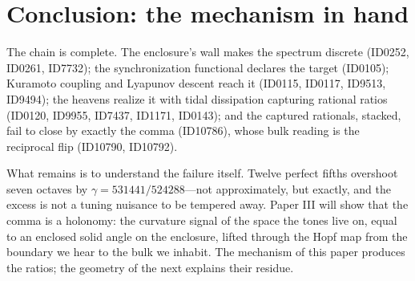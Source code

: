 \documentclass[11pt]{article}
\theoremstyle{remark}
\begin{document}
\section{Conclusion: the mechanism in hand}
\label{sec:conclusion}

The chain is complete. The enclosure's wall makes the spectrum discrete (ID0252, ID0261, ID7732); the synchronization functional declares the target (ID0105); Kuramoto coupling and Lyapunov descent reach it (ID0115, ID0117, ID9513, ID9494); the heavens realize it with tidal dissipation capturing rational ratios (ID0120, ID9955, ID7437, ID1171, ID0143); and the captured rationals, stacked, fail to close by exactly the comma (ID10786), whose bulk reading is the reciprocal flip (ID10790, ID10792).

What remains is to understand the failure itself. Twelve perfect fifths overshoot seven octaves by $\gamma = 531441/524288$---not approximately, but exactly, and the excess is not a tuning nuisance to be tempered away. Paper III will show that the comma is a holonomy: the curvature signal of the space the tones live on, equal to an enclosed solid angle on the enclosure, lifted through the Hopf map from the boundary we hear to the bulk we inhabit. The mechanism of this paper produces the ratios; the geometry of the next explains their residue.
\end{document}
